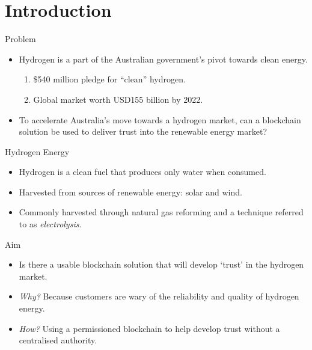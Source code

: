 \section{Introduction}
\begin{frame}{Problem}
    \begin{itemize}
        \item Hydrogen is a part of the Australian government's pivot towards
              clean energy.
              \begin{enumerate}[i]
                  \item \$540 million pledge for ``clean'' hydrogen.
                  \item Global market worth USD155 billion by 2022.
              \end{enumerate}
        \item To accelerate Australia's move towards a hydrogen market,
              can a blockchain solution be used to deliver trust into
              the renewable energy market?
    \end{itemize}
\end{frame}

\begin{frame}{Hydrogen Energy}
    \begin{itemize}
        \item Hydrogen is a clean fuel that produces only water when consumed.
        \item Harvested from sources of renewable energy: solar and wind.
        \item Commonly harvested through natural gas reforming and a
              technique referred to as \textit{electrolysis}.
    \end{itemize}
\end{frame}

\begin{frame}{Aim}
    \begin{itemize}
        \item Is there a usable blockchain solution that will develop
              `trust' in the hydrogen market.
        \item \textit{Why?} Because customers are wary of the reliability
              and quality of hydrogen energy.
        \item \textit{How?} Using a permissioned blockchain to help
              develop trust without a centralised authority.
    \end{itemize}
\end{frame}